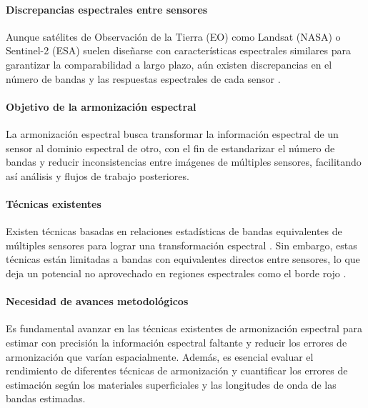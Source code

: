                 \paragraph{Discrepancias espectrales entre sensores}
                    Aunque satélites de Observación de la Tierra (EO) como Landsat (NASA) o Sentinel-2 (ESA) suelen diseñarse con características espectrales similares para garantizar la comparabilidad a largo plazo, aún existen discrepancias en el número de bandas y las respuestas espectrales de cada sensor \autocite{drusch2012sentinel}.
                    
                \paragraph{Objetivo de la armonización espectral}
                    La armonización espectral busca transformar la información espectral de un sensor al dominio espectral de otro, con el fin de estandarizar el número de bandas y reducir inconsistencias entre imágenes de múltiples sensores, facilitando así análisis y flujos de trabajo posteriores.
                    
                \paragraph{Técnicas existentes}
                    Existen técnicas basadas en relaciones estadísticas de bandas equivalentes de múltiples sensores para lograr una transformación espectral \autocite{chastain2019empirical, claverie2018harmonized, flood2014continuity, roy2016characterization}. Sin embargo, estas técnicas están limitadas a bandas con equivalentes directos entre sensores, lo que deja un potencial no aprovechado en regiones espectrales como el borde rojo \autocite{filella1994red}.
                    
                \paragraph{Necesidad de avances metodológicos}
                    Es fundamental avanzar en las técnicas existentes de armonización espectral para estimar con precisión la información espectral faltante y reducir los errores de armonización que varían espacialmente. Además, es esencial evaluar el rendimiento de diferentes técnicas de armonización y cuantificar los errores de estimación según los materiales superficiales y las longitudes de onda de las bandas estimadas.
                    
